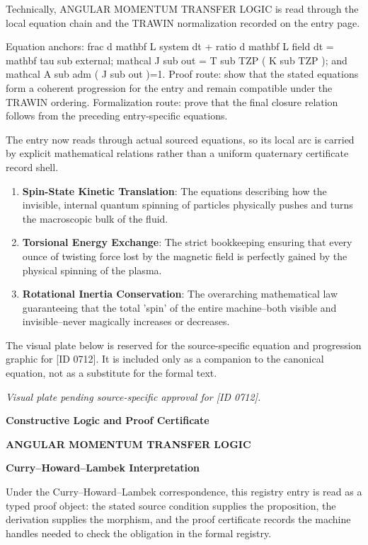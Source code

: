 Technically, ANGULAR MOMENTUM TRANSFER LOGIC is read through the local equation chain and the TRAWIN normalization recorded on the entry page.

Equation anchors: frac d mathbf L system dt + ratio d mathbf L field dt = mathbf tau sub external; mathcal J sub out = T sub TZP ( K sub TZP ); and mathcal A sub adm ( J sub out )=1. Proof route: show that the stated equations form a coherent progression for the entry and remain compatible under the TRAWIN ordering. Formalization route: prove that the final closure relation follows from the preceding entry-specific equations.

The entry now reads through actual sourced equations, so its local arc is carried by explicit mathematical relations rather than a uniform quaternary certificate record shell.
\endgroup

\begin{enumerate}[leftmargin=1.6em,itemsep=6pt,topsep=4pt]
\item \textbf{Spin-State Kinetic Translation}: The equations describing how the invisible, internal quantum spinning of particles physically pushes and turns the macroscopic bulk of the fluid.
\item \textbf{Torsional Energy Exchange}: The strict bookkeeping ensuring that every ounce of twisting force lost by the magnetic field is perfectly gained by the physical spinning of the plasma.
\item \textbf{Rotational Inertia Conservation}: The overarching mathematical law guaranteeing that the total 'spin' of the entire machine--both visible and invisible--never magically increases or decreases.
\end{enumerate}

\begingroup\footnotesize\sloppy
The visual plate below is reserved for the source-specific equation and progression graphic for [ID 0712]. It is included only as a companion to the canonical equation, not as a substitute for the formal text.
\par\endgroup
\begingroup\footnotesize\itshape
Visual plate pending source-specific approval for [ID 0712].
\par\endgroup

\clearpage
\begingroup\tzpsupportsetup
\noindent\textbf{\fontsize{10.8pt}{12.8pt}\selectfont [ID 0712] Constructive Logic and Proof Certificate}\par
\noindent\textbf{\fontsize{10pt}{12pt}\selectfont ANGULAR MOMENTUM TRANSFER LOGIC}\par
\vspace{0.45em}
\begingroup
\footnotesize
\setlength{\parskip}{0.22em}
\setlength{\parindent}{0pt}
\noindent\textbf{Curry--Howard--Lambek Interpretation}\par
Under the Curry--Howard--Lambek correspondence, this registry entry is read as a typed proof
object: the stated source condition supplies the proposition, the derivation supplies the
morphism, and the proof certificate records the machine handles needed to check the obligation
in the formal registry.

